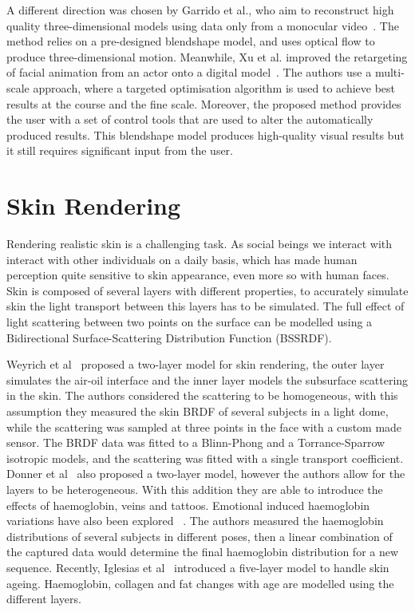 A different direction was chosen by Garrido et al., who aim to reconstruct high quality three-dimensional models using data only from a monocular video~\cite{Garrido:2013}. The method relies on a pre-designed blendshape model, and uses optical flow to produce three-dimensional motion. Meanwhile, Xu et al. improved the retargeting of facial animation from an actor onto a digital model~\cite{Xu:2014}. The authors use a multi-scale approach, where a targeted optimisation algorithm is used to achieve best results at the course and the fine scale. Moreover, the proposed method provides the user with a set of control tools that are used to alter the automatically produced results. This blendshape model produces high-quality visual results but it still requires significant input from the user.


\section{Skin Rendering}

Rendering realistic skin is a challenging task.
As social beings we interact with interact with other individuals on a daily basis, which has made human perception quite sensitive to skin appearance, even more so with human faces.
Skin is composed of several layers with different properties, to accurately simulate skin the light transport between this layers has to be simulated.
The full effect of light scattering between two points on the surface can be modelled using a Bidirectional Surface-Scattering Distribution Function (BSSRDF).

Weyrich et al~\cite{Weyrich2006} proposed a two-layer model for skin rendering, the outer layer simulates the air-oil interface and the inner layer models the subsurface scattering in the skin.
The authors considered the scattering to be homogeneous, with this assumption they measured the skin BRDF of several subjects in a light dome, while the scattering was sampled at three points in the face with a custom made sensor.
The BRDF data was fitted to a Blinn-Phong and a Torrance-Sparrow isotropic models, and the scattering was fitted with a single transport coefficient.
Donner et al~\cite{Donner2008} also proposed a two-layer model, however the authors allow for the layers to be heterogeneous.
With this addition they are able to introduce the effects of haemoglobin, veins and tattoos.
Emotional induced haemoglobin variations have also been explored ~\cite{Jimenez2010}.
The authors measured the haemoglobin distributions of several subjects in different poses, then a linear combination of the captured data would determine the final haemoglobin distribution for a new sequence.
Recently, Iglesias et al~\cite{Iglesias2015} introduced a five-layer model to handle skin ageing.
Haemoglobin, collagen and fat changes with age are modelled using the different layers.

